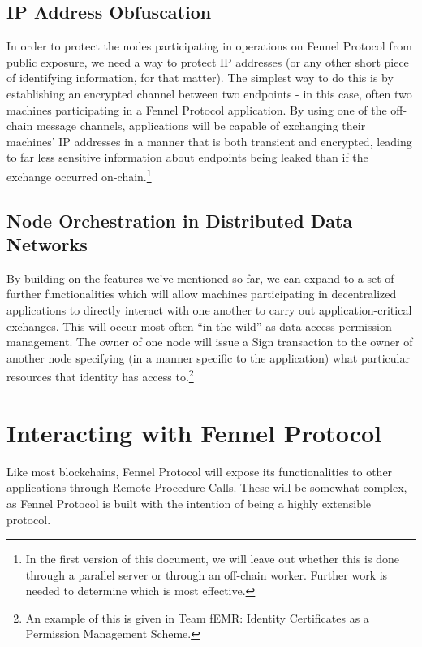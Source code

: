 \documentclass[]{article}
\begin{document}
\subsection{IP Address Obfuscation}
\label{scrivauto:22}

In order to protect the nodes participating in operations on Fennel Protocol from public exposure, we need a way to protect IP addresses (or any other short piece of identifying information, for that matter). The simplest way to do this is by establishing an encrypted channel between two endpoints - in this case, often two machines participating in a Fennel Protocol application. By using one of the off-chain message channels, applications will be capable of exchanging their machines' IP addresses in a manner that is both transient and encrypted, leading to far less sensitive information about endpoints being leaked than if the exchange occurred on-chain.\footnote{In the first version of this document, we will leave out whether this is done through a parallel server or through an off-chain worker. Further work is needed to determine which is most effective.}

\subsection{Node Orchestration in Distributed Data Networks}
\label{scrivauto:23}

By building on the features we've mentioned so far, we can expand to a set of further functionalities which will allow machines participating in decentralized applications to directly interact with one another to carry out application-critical exchanges. This will occur most often ``in the wild'' as data access permission management. The owner of one node will issue a Sign transaction to the owner of another node specifying (in a manner specific to the application) what particular resources that identity has access to.\footnote{An example of this is given in Team fEMR: Identity Certificates as a Permission Management Scheme.}

\section{Interacting with Fennel Protocol}
\label{scrivauto:24}

Like most blockchains, Fennel Protocol will expose its functionalities to other applications through Remote Procedure Calls. These will be somewhat complex, as Fennel Protocol is built with the intention of being a highly extensible protocol. 
\end{document}

